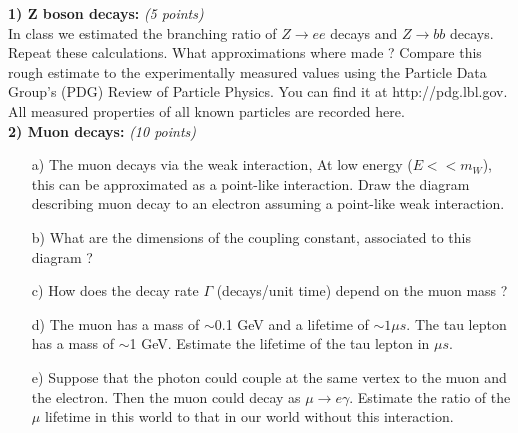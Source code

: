 {\large

\textbf{1) Z boson decays: } \hfill \textit{(5 points)}\\
In class we estimated the branching ratio of $Z\rightarrow ee$ decays and $Z\rightarrow bb$ decays.  
Repeat these calculations.
What approximations where made ?
Compare this rough estimate to the experimentally measured values using the Particle Data Group's (PDG) Review of Particle Physics. 
You can find it at http://pdg.lbl.gov.
All measured properties of all known particles are recorded here.\\




\textbf{2) Muon decays: } \hfill \textit{(10 points)}\\
\begin{itemize}
  \item[a)]{ The muon decays via the weak interaction,  At low energy ($E << m_W$), this can be approximated as a point-like interaction. 
  Draw the diagram describing muon decay to an electron assuming a point-like weak interaction.
}
  \item[b)]{ What are the dimensions of the coupling constant, associated to this diagram  ?
  }
  \item[c)] How does the decay rate $\Gamma$ (decays/unit time)  depend on the muon mass ? 
  \item[d)]{ The muon has a mass of $\sim$0.1 GeV and a lifetime of $\sim 1 \mu s$. The tau lepton has a mass of {$\sim$1 GeV}. Estimate the lifetime of the tau lepton in $\mu s$.
}
  \item[e)] {Suppose that the photon could couple at the same vertex to the muon and the electron. Then the muon could decay as $\mu\rightarrow e \gamma$. 
  Estimate the ratio of the $\mu$ lifetime in this world to that in our world without this interaction.
  }
\end{itemize}



\vspace*{0.25in}

}
